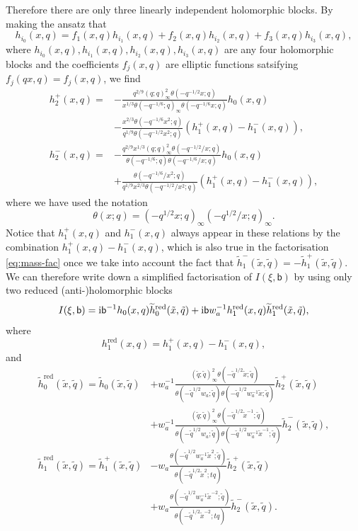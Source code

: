 \documentclass[a4paper,11pt]{article}
\theoremstyle{definition}
\newcommand{\ri}{{\rm i}}
\def\tq{{\tilde{q}}}
\def\tx{{\tilde{x}}}
\newcommand{\bb}{\mathsf{b}}
\newcommand{\wt}[1]{\widetilde{#1}}
\newcommand{\nn}{\nonumber \\}
\begin{document}
Therefore there are only three linearly independent holomorphic blocks.
By making the ansatz that
\begin{equation}
  h_{i_0}(x,q) =
  f_1(x,q)h_{i_1}(x,q)+f_2(x,q)h_{i_2}(x,q)+f_3(x,q)h_{i_3}(x,q),
\end{equation}
where $h_{i_0}(x,q),h_{i_1}(x,q),h_{i_2}(x,q),h_{i_3}(x,q)$ are any
four holomorphic blocks and the coefficients $f_j(x,q)$ are elliptic
functions satsifying $f_j(qx,q) = f_j(x,q)$, we find
\begin{subequations}
  \begin{align}
    h_2^+(x,q) =
    &-\frac{q^{2/9}(q;q)_\infty^2\theta(-q^{-1/2}x;q)}
      {x^{1/3}\theta(-q^{-1/6};q)_\infty\theta(-q^{-1/6}x;q)}h_0(x,q)\nn
    & -\frac{x^{2/3}\theta(-q^{-1/6}x^2;q)}
      {q^{1/9}\theta(-q^{-1/2}x^2;q)}(h_1^+(x,q)-h_1^-(x,q)),
      \label{eq:h2p-h0h1}\\
    h_2^-(x,q) =
    &-\frac{q^{2/9}x^{1/3}(q;q)_\infty^2\theta(-q^{-1/2}/x;q)}
      {\theta(-q^{-1/6};q)\theta(-q^{-1/6}/x;q)}h_0(x,q)
      \nn
    &+\frac{\theta(-q^{-1/6}/x^2;q)}
      {q^{1/9}x^{2/3}\theta(-q^{-1/2}/x^2;q)}(h_1^+(x,q)-h_1^-(x,q)),
      \label{eq:h2n-h0h1}
  \end{align}
\end{subequations}
where we have used the notation
\begin{equation}
  \theta(x;q) = (-q^{1/2}x;q)_\infty(-q^{1/2}/x;q)_\infty.
\end{equation}
Notice that $h^+_1(x,q)$ and $h^-_1(x,q)$ always appear in these
relations by the combination $h^+_1(x,q) -h^-_1(x,q) $, which is also
true in the factorisation \eqref{eq:mass-fac} once we take into
account the fact that
$\tilde{h}^-_1(\tx,\tq) = -\tilde{h}^+_1(\tx,\tq)$.  We can therefore
write down a simplified factorisation of $I(\xi,\bb)$ by using only two
reduced (anti-)holomorphic blocks
%
\begin{equation}
  I(\xi,\bb) = \ri\bb^{-1} h_0(x,q) \wt{h}_0^{\text{red}}(\tx,\tq)
  +\ri\bb w_a^{-1} h_1^{\text{red}}(x,q)
  \wt{h}_1^{\text{red}}(\tx,\tq),
\end{equation}
%
where
%
\begin{equation}
  h_1^{\text{red}}(x,q) = h_1^+(x,q) - h_1^-(x,q),
\end{equation}
%
and
%
\begin{subequations}
  \begin{align}
    \wt{h}_0^{\text{red}}(\tx,\tq) =
    \wt{h}_0(\tx,\tq)
    &+w_a^{-1}\frac{(\tq;\tq)_\infty^2\theta(-\tq^{1/2}\tx;\tq)}
      {\theta(-\tq^{1/2}w_a;\tq)\theta(-\tq^{1/2}w_a^{-1}\tx;\tq)}
      \wt{h}_2^+(\tx,\tq)\nn
    &+w_a^{-1}\frac{(\tq;\tq)_\infty^2\theta(-\tq^{1/2}\tx^{-1};\tq)}
      {\theta(-\tq^{1/2}w_a;\tq)\theta(-\tq^{1/2}w_a^{-1}\tx^{-1};\tq)}
      \wt{h}_2^-(\tx,\tq),\\
    \wt{h}_1^{\text{red}}(\tx,\tq) =
    \wt{h}_1^+(\tx,\tq)
    &-w_a\frac{\theta(-\tq^{1/2}w_a^{-1}\tx^2;\tq)}
      {\theta(-\tq^{1/2}\tx^2;tq)}\wt{h}_2^+(\tx,\tq)\nn
    &+w_a\frac{\theta(-\tq^{1/2}w_a^{-1}\tx^{-2};\tq)}
      {\theta(-\tq^{1/2}\tx^{-2};tq)}\wt{h}_2^-(\tx,\tq).
  \end{align}
\end{subequations}
\end{document}
